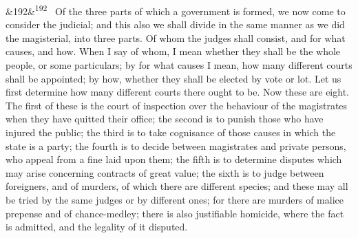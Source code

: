 \documentclass[12pt]{article}
\newcommand{\para}[1][]{\par\noindent\ifx&#1&\else\textsuperscript{\footnotesize #1}~\fi}
\begin{document}
\para[192] Of the three parts of which a government is formed, we now come to consider the judicial; and this also we shall divide in the same manner as we did the magisterial, into three parts. Of whom the judges shall consist, and for what causes, and how. When I say of whom, I mean whether they shall be the whole people, or some particulars; by for what causes I mean, how many different courts shall be appointed; by how, whether they shall be elected by vote or lot. Let us first determine how many different courts there ought to be. Now these are eight. The first of these is the court of inspection over the behaviour of the magistrates when they have quitted their office; the second is to punish those who have injured the public; the third is to take cognisance of those causes in which the state is a party; the fourth is to decide between magistrates and private persons, who appeal from a fine laid upon them; the fifth is to determine disputes which may arise concerning contracts of great value; the sixth is to judge between foreigners, and of murders, of which there are different species; and these may all be tried by the same judges or by different ones; for there are murders of malice prepense and of chance-medley; there is also justifiable homicide, where the fact is admitted, and the legality of it disputed.
\end{document}
